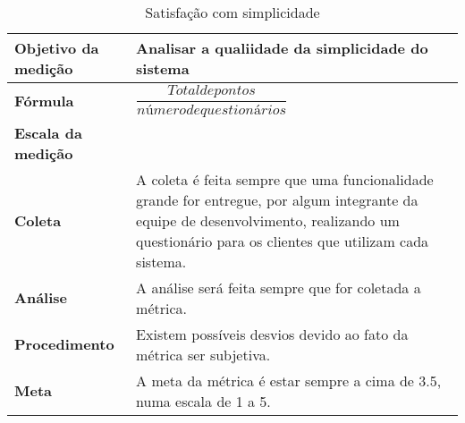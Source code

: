 \begin{table}[H]
\centering
\begin{tabular}{|p{4cm}|p{5cm}|}
\hline
	\textbf{Objetivo da medição} &
	Analisar a qualiidade da simplicidade do sistema
	\\ \hline
	\textbf{Fórmula} &
	$\dfrac{Total de pontos}{número de questionários}$
	\\ \hline
	\textbf{Escala da medição} &

	\\ \hline
	\textbf{Coleta} &
	A coleta é feita sempre que uma funcionalidade grande for entregue, por algum integrante da equipe de desenvolvimento, realizando um questionário para os clientes que utilizam cada sistema.
	\\ \hline
	\textbf{Análise} &
	A análise será feita sempre que for coletada a métrica.
	\\ \hline
	\textbf{Procedimento} &
	Existem possíveis desvios devido ao fato da métrica ser subjetiva.
	\\ \hline
  \textbf{Meta} &
	A meta da métrica é estar sempre a cima de 3.5, numa escala de 1 a 5.
  \\ \hline
\end{tabular}
\caption{Satisfação com simplicidade}
\label{tab:satisfacao_simplicidade}
\end{table}

